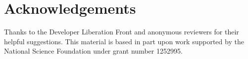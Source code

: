 \section*{Acknowledgements}

Thanks to the Developer Liberation Front and anonymous
reviewers for their helpful suggestions.
This material is based in part upon work supported by the 
National Science Foundation under grant number 1252995.

